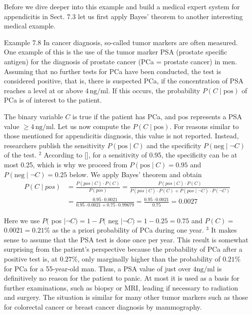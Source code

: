 \documentclass[10pt]{book}
\begin{document}
Before we dive deeper into this example and build a medical expert system for appendicitis in Sect. 7.3 let us first apply Bayes' theorem to another interesting medical example.

Example 7.8 In cancer diagnosis, so-called tumor markers are often measured. One example of this is the use of the tumor marker PSA (prostate specific antigen) for the diagnosis of prostate cancer (PCa = prostate cancer) in men. Assuming that no further tests for PCa have been conducted, the test is considered positive, that is, there is suspected PCa, if the concentration of PSA reaches a level at or above $4 \,\mathrm{ng} / \mathrm{ml}$. If this occurs, the probability $P(C \mid \text{pos})$ of PCa is of interest to the patient.

The binary variable $C$ is true if the patient has PCa, and pos represents a PSA value $\geq 4 \,\mathrm{ng}/\mathrm{ml}$. Let us now compute the $P(C \mid \text{pos})$. For reasons similar to those mentioned for appendicitis diagnosis, this value is not reported. Instead, researchers publish the sensitivity $P(\text{pos} \mid C)$ and the specificity $P(\text{neg} \mid \neg C)$ of the test. ${ }^{2}$ According to [\cite{hammerer2004psa}], for a sensitivity of 0.95, the specificity can be at most 0.25, which is why we proceed from $P(\text{pos} \mid C)=0.95$ and $P(\text{neg} \mid \neg C)=0.25$ below. We apply Bayes' theorem and obtain
$$
\begin{aligned}
P(C \mid p o s) & = \frac{P(p o s \mid C) \cdot P(C)}{P(p o s)} = \frac{P(p o s \mid C) \cdot P(C)}{P(p o s \mid C) \cdot P(C) + P(p o s \mid \neg C) \cdot P(\neg C)} \\
& = \frac{0.95 \cdot 0.0021}{0.95 \cdot 0.0021 + 0.75 \cdot 0.99679} = \frac{0.95 \cdot 0.0021}{0.75} = 0.0027
\end{aligned}
$$

Here we use $P($ pos $\mid \neg C)=1-P($ neg $\mid \neg C)=1-0.25=0.75$ and $P(C)=$ $0.0021=0.21 \%$ as the a priori probability of PCa during one year. ${ }^{3}$ It makes sense to assume that the PSA test is done once per year. This result is somewhat surprising from the patient's perspective because the probability of PCa after a positive test is, at $0.27 \%$, only marginally higher than the probability of $0.21 \%$ for PCa for a 55-year-old man. Thus, a PSA value of just over $4 \mathrm{ng} / \mathrm{ml}$ is definitively no reason for the patient to panic. At most it is used as a basis for further examinations, such as biopsy or MRI, leading if necessary to radiation and surgery. The situation is similar for many other tumor markers such as those for colorectal cancer or breast cancer diagnosis by mammography.
\end{document}
